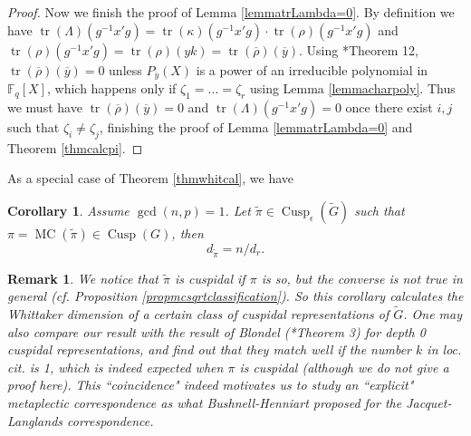 \documentclass{amsart}
\numberwithin{equation}{section}
\newtheorem{corollary}[theorem]{\bf{Corollary}}
\newtheorem{remark}[theorem]{\bf{Remark}}
\newcommand{\mrtr}{\operatorname{tr}}
\newcommand{\mrgcd}{\operatorname{gcd}}
\newcommand{\mrcusp}{\operatorname{Cusp}}
\newcommand{\mrmc}{\operatorname{MC}}
\newcommand{\mbf}{\mathbb{F}}
\newcommand{\wt}[1]{\widetilde{#1}}
\begin{document}
\begin{proof}
			Now we finish the proof of Lemma \ref{lemmatrLambda=0}. By definition we have $\mrtr(\Lambda)(g^{-1}x'g)=\mrtr(\kappa)(g^{-1}x'g)\cdot\mrtr(\rho)(g^{-1}x'g)$ and $\mrtr(\rho)(g^{-1}x'g)=\mrtr(\rho)(yk)=\mrtr(\overline{\rho})(\overline{y})$. Using \cite{green1955characters}*{Theorem 12},  $\mrtr(\overline{\rho})(\overline{y})=0$ unless $P_{\overline{y}}(X)$ is a power of an irreducible polynomial in $\mbf_{q}[X]$, which happens only if $\zeta_{1}=...=\zeta_{r}$
			using Lemma \ref{lemmacharpoly}. Thus we must have $\mrtr(\overline{\rho})(\overline{y})=0$ and $\mrtr(\Lambda)(g^{-1}x'g)=0$ once there exist $i,j$ such that $\zeta_{i}\neq\zeta_{j}$, finishing the proof of Lemma \ref{lemmatrLambda=0} and Theorem \ref{thmcalcpi}.
			
		\end{proof}
		
		As a special case of Theorem \ref{thmwhitcal}, we have
		
		\begin{corollary}
			
			Assume $\mrgcd(n,p)=1$. Let $\wt{\pi}\in\mrcusp_{\epsilon}(\wt{G})$ such that $\pi=\mrmc(\wt{\pi})\in\mrcusp(G)$, then
			$$d_{\wt{\pi}}=n/d_{r}.$$
			
		\end{corollary}
		
		\begin{remark}
			
			We notice that $\wt{\pi}$ is cuspidal if $\pi$ is so, but the converse is not true in general (\emph{cf.} Proposition \ref{propmcsqrtclassification}). So this corollary calculates the Whittaker dimension of a certain class of cuspidal representations of $\wt{G}$. One may also compare our result with the result of Blondel (\cite{blondel1992uniqueness}*{Theorem 3}) for depth 0 cuspidal representations, and find out that they match well if the number $k$ in \emph{loc. cit.} is 1, which is indeed expected when $\pi$ is cuspidal (although we do not give a proof here). This ``coincidence" indeed motivates us to study an ``explicit" metaplectic correspondence as what Bushnell-Henniart \cite{bushnell2011essentially} proposed for the Jacquet-Langlands correspondence.
			
		\end{remark}
		
\end{document}
